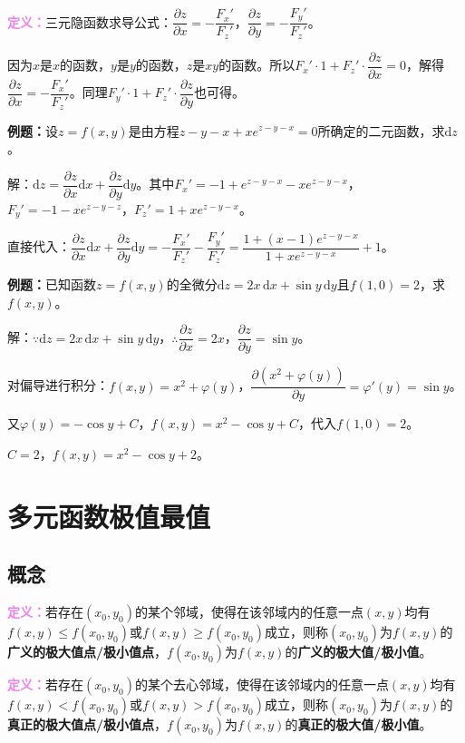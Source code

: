 \textcolor{violet}{\textbf{定义：}}三元隐函数求导公式：$\dfrac{\partial z}{\partial x}=-\dfrac{F_x'}{F_z'}$，$\dfrac{\partial z}{\partial y}=-\dfrac{F_y'}{F_z'}$。

因为$x$是$x$的函数，$y$是$y$的函数，$z$是$xy$的函数。所以$F_x'\cdot1+F_z'\cdot\dfrac{\partial z}{\partial x}=0$，解得$\dfrac{\partial z}{\partial x}=-\dfrac{F_x'}{F_z'}$。同理$F_y'\cdot1+F_z'\cdot\dfrac{\partial z}{\partial y}$也可得。

\textbf{例题：}设$z=f(x,y)$是由方程$z-y-x+xe^{z-y-x}=0$所确定的二元函数，求$\textrm{d}z$。

解：$\textrm{d}z=\dfrac{\partial z}{\partial x}\textrm{d}x+\dfrac{\partial z}{\partial y}\textrm{d}y$。其中$F_x'=-1+e^{z-y-x}-xe^{z-y-x}$，$F_y'=-1-xe^{z-y-z}$，$F_z'=1+xe^{z-y-x}$。

直接代入：$\dfrac{\partial z}{\partial x}\textrm{d}x+\dfrac{\partial z}{\partial y}\textrm{d}y=-\dfrac{F_x'}{F_z'}-\dfrac{F_y'}{F_z'}=\dfrac{1+(x-1)e^{z-y-x}}{1+xe^{z-y-x}}+1$。

\textbf{例题：}已知函数$z=f(x,y)$的全微分$\textrm{d}z=2x\,\textrm{d}x+\sin y\,\textrm{d}y$且$f(1,0)=2$，求$f(x,y)$。

解：$\because\textrm{d}z=2x\,\textrm{d}x+\sin y\,\textrm{d}y$，$\therefore\dfrac{\partial z}{\partial x}=2x$，$\dfrac{\partial z}{\partial y}=\sin y$。

对偏导进行积分：$f(x,y)=x^2+\varphi(y)$，$\dfrac{\partial(x^2+\varphi(y))}{\partial y}=\varphi'(y)=\sin y$。

又$\varphi(y)=-\cos y+C$，$f(x,y)=x^2-\cos y+C$，代入$f(1,0)=2$。

$C=2$，$f(x,y)=x^2-\cos y+2$。

\section{多元函数极值最值}

\subsection{概念}

\textcolor{violet}{\textbf{定义：}}若存在$(x_0,y_0)$的某个邻域，使得在该邻域内的任意一点$(x,y)$均有$f(x,y)\leqslant f(x_0,y_0)$或$f(x,y)\geqslant f(x_0,y_0)$成立，则称$(x_0,y_0)$为$f(x,y)$的\textbf{广义的极大值点/极小值点}，$f(x_0,y_0)$为$f(x,y)$的\textbf{广义的极大值/极小值}。

\textcolor{violet}{\textbf{定义：}}若存在$(x_0,y_0)$的某个去心邻域，使得在该邻域内的任意一点$(x,y)$均有$f(x,y)<f(x_0,y_0)$或$f(x,y)>f(x_0,y_0)$成立，则称$(x_0,y_0)$为$f(x,y)$的\textbf{真正的极大值点/极小值点}，$f(x_0,y_0)$为$f(x,y)$的\textbf{真正的极大值/极小值}。

